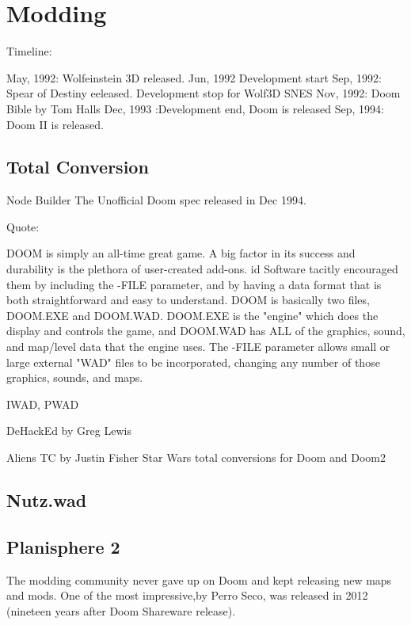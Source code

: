 \section{Modding}
Timeline:

May, 1992: Wolfeinstein 3D released.
Jun, 1992 Development start
Sep, 1992: Spear of Destiny eeleased.
Development stop for Wolf3D SNES
Nov, 1992: Doom Bible by Tom Halls
Dec, 1993 :Development end, Doom is released
Sep, 1994: Doom II is released.


\subsection{Total Conversion}


Node Builder
The Unofficial Doom spec released in Dec 1994. 

Quote:

DOOM is simply an all-time great game. A big factor in its success
and durability is the plethora of user-created add-ons. id Software
tacitly encouraged them by including the -FILE parameter, and by having
a data format that is both straightforward and easy to understand.
DOOM is basically two files, DOOM.EXE and DOOM.WAD. DOOM.EXE is the
"engine" which does the display and controls the game, and DOOM.WAD has
ALL of the graphics, sound, and map/level data that the engine uses.
The -FILE parameter allows small or large external "WAD" files to be
incorporated, changing any number of those graphics, sounds, and maps.

IWAD, PWAD


DeHackEd by Greg Lewis


Aliens TC by Justin Fisher
Star Wars total conversions for Doom and Doom2

\subsection{Nutz.wad}

\subsection{Planisphere 2}
The modding community never gave up on Doom and kept releasing new maps and mods. One of the most impressive,by  Perro Seco, was released in 2012 (nineteen years after Doom Shareware release).\\
\par
{} 
\par
{} 
 